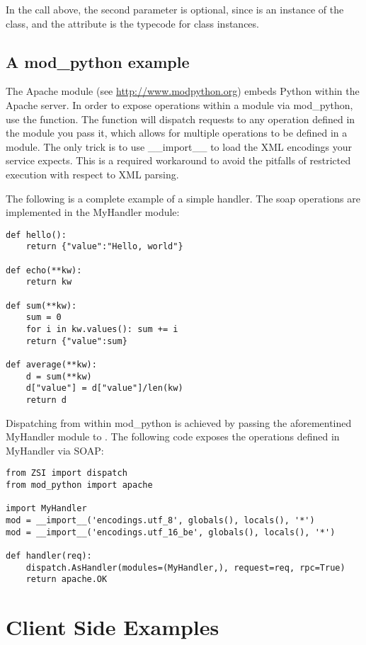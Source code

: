 In the  call above, the second parameter is optional, since
 is an instance of the  class, and the
 attribute is the typecode for class instances.


\subsection{A mod_python example}

The Apache module  (see
\url{http://www.modpython.org}) embeds Python within the Apache server.
In order to expose operations within a module via mod_python, use the
 function.  The 
function will dispatch requests to any operation defined in the module you
pass it, which allows for multiple operations to be defined in a module.
The only trick is to use __import__ to load the XML encodings your service
expects.  This is a required workaround to avoid the pitfalls of restricted
execution with respect to XML parsing.

The following is a complete example of a simple handler.  The soap operations
are implemented in the MyHandler module:

\begin{verbatim}
def hello():
    return {"value":"Hello, world"}

def echo(**kw):
    return kw

def sum(**kw):
    sum = 0
    for i in kw.values(): sum += i
	return {"value":sum}

def average(**kw):
	d = sum(**kw)
    d["value"] = d["value"]/len(kw)
	return d
\end{verbatim}

Dispatching from within mod_python is achieved by passing the aforementined
MyHandler module to .  The following code exposes
the operations defined in MyHandler via SOAP:

\begin{verbatim}
from ZSI import dispatch
from mod_python import apache

import MyHandler
mod = __import__('encodings.utf_8', globals(), locals(), '*')
mod = __import__('encodings.utf_16_be', globals(), locals(), '*')

def handler(req):
    dispatch.AsHandler(modules=(MyHandler,), request=req, rpc=True)
    return apache.OK
\end{verbatim}


\section{Client Side Examples}

